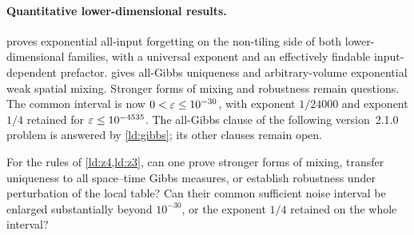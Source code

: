 \paragraph{Quantitative lower-dimensional results.}
 proves exponential all-input forgetting on the non-tiling side of both lower-dimensional families, with a universal exponent and an effectively findable input-dependent prefactor.  gives all-Gibbs uniqueness and arbitrary-volume exponential weak spatial mixing. Stronger forms of mixing and robustness remain questions. The common interval is now $0<\varepsilon\le10^{-30}$, with exponent $1/24000$ and exponent $1/4$ retained for $\varepsilon\le10^{-4535}$. The all-Gibbs clause of the following version~2.1.0 problem is answered by \cref{ld:gibbs}; its other clauses remain open.

\begin{problem}\label{prob:lower-stronger}
For the rules of \cref{ld:z4,ld:z3}, can one prove stronger forms of mixing, transfer uniqueness to all space--time Gibbs measures, or establish robustness under perturbation of the local table? Can their common sufficient noise interval be enlarged substantially beyond $10^{-30}$, or the exponent $1/4$ retained on the whole interval?
\end{problem}
